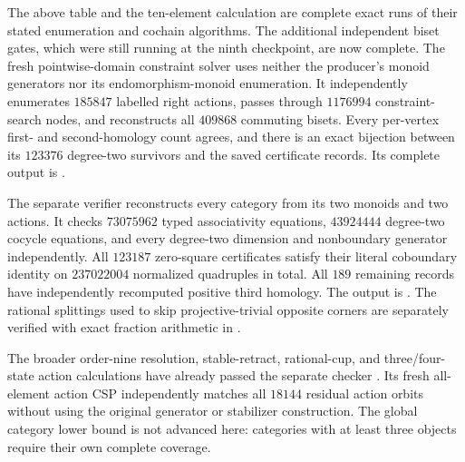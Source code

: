 \begin{remark}\label{C:fourteen-triangular-verification-scope}
The above table and the ten-element calculation are complete exact
runs of their stated enumeration and cochain algorithms.  The additional
independent biset gates, which were still running at the ninth checkpoint,
are now complete.  The fresh pointwise-domain constraint solver
 uses neither the
producer's monoid generators nor its endomorphism-monoid enumeration.
It independently enumerates $185847$ labelled right actions, passes
through $1176994$ constraint-search nodes, and reconstructs all
$409868$ commuting bisets.  Every per-vertex first- and second-homology
count agrees, and there is an exact bijection between its $123376$
degree-two survivors and the saved certificate records.  Its complete
output is .

The separate verifier
 reconstructs every
category from its two monoids and two actions.  It checks $73075962$
typed associativity equations, $43924444$ degree-two cocycle equations,
and every degree-two dimension and nonboundary generator independently.
All $123187$ zero-square certificates satisfy their literal coboundary
identity on $237022004$ normalized quadruples in total.  All $189$
remaining records have independently recomputed positive third homology.
The output is .
The rational splittings used to skip projective-trivial opposite corners
are separately verified with exact fraction arithmetic in
.

The broader
order-nine resolution, stable-retract, rational-cup, and three/four-state
action calculations have already passed the separate checker
.  Its fresh all-element
action CSP independently matches all $18144$ residual action orbits
without using the original generator or stabilizer construction.
The global category lower bound is not advanced here: categories
with at least three objects require their own complete coverage.
\end{remark}
